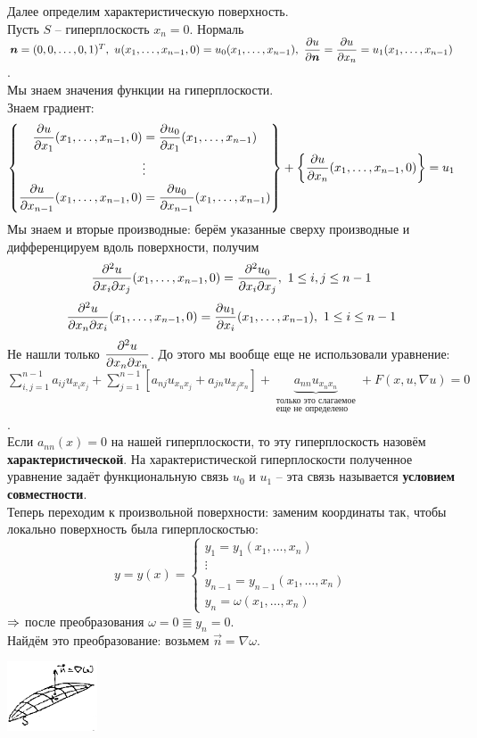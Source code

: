Далее определим характеристическую поверхность.\\
Пусть $S$ -- гиперплоскость $x_n = 0$. Нормаль $\boldsymbol{n} = (0,0,\dots,0, 1)^T,\ u(x_1, \dots, x_{n-1}, 0) = u_0(x_1, \dots, x_{n-1}),\ \dfrac{\partial u}{\partial\boldsymbol{n}} = \dfrac{\partial u}{\partial x_n} = u_1(x_1, \dots, x_{n-1}) $.\\
Мы знаем значения функции на гиперплоскости.\\
Знаем градиент:
\begin{equation*}
\left\{\begin{aligned}
\frac{\partial u}{\partial x_1}(x_1, \dots, x_{n-1}, 0) &= \frac{\partial u_0}{\partial x_1}(x_1, \dots, x_{n-1})\\ 
&\vdots \\
\frac{\partial u}{\partial x_{n-1}}(x_1, \dots, x_{n-1}, 0) &= \frac{\partial u_0}{\partial x_{n-1}}(x_1, \dots, x_{n-1})
\end{aligned} \right\}
+\left\{\frac{\partial u}{\partial x_n}(x_1,\dots,x_{n-1},0)\right\} = u_1
\end{equation*}
Мы знаем и вторые производные: берём указанные сверху производные и дифференцируем вдоль поверхности, получим \[\frac{\subd^2u}{\subd x_i\subd x_j}(x_1,\dots,x_{n-1}, 0) = \frac{\subd^2u_0}{\subd x_i\subd x_j},\ 1\le i,j \le n-1 \]
\[\frac{\partial^2u}{\partial x_n\partial x_i}(x_1,\dots,x_{n-1}, 0) = \frac{\partial u_1}{\partial x_i}(x_1,\dots,x_{n-1}),\ 1\le i\le n-1     \]
Не нашли только $\displaystyle\frac{\partial^2 u}{\partial x_n\partial x_n}$. До этого мы вообще еще не использовали уравнение:\\$\displaystyle\sum\limits_{i,j=1}^{n-1}a_{ij}u_{x_ix_j} + \displaystyle\sum\limits_{j=1}^{n-1}\left[a_{nj}u_{x_nx_j} + a_{jn}u_{x_jx_n}\right] + \underbrace{a_{nn}u_{x_nx_n}}_{\substack{\text{только это слагаемое}\\ \text{еще не определено}}} + F(x, u, \nabla u) = 0 $.\\
Если $a_{nn}(x) = 0$ на нашей гиперплоскости, то эту гиперплоскость назовём {\bf характеристической}. На характеристической гиперплоскости полученное уравнение задаёт функциональную связь $u_0$ и $u_1$ -- эта связь называется {\bf условием совместности}.\\
Теперь переходим к произвольной поверхности: заменим координаты так, чтобы локально поверхность была гиперплоскостью:\\
\[y = y(x) = \begin{cases} y_1 = y_1(x_1,\dots, x_n) \\ \vdots \\ y_{n-1} = y_{n-1}(x_1,\dots,x_n) \\ y_n = \omega(x_1,\dots,x_n) \end{cases} \]
$\Rightarrow$ после преобразования $\omega=0 \Equiv y_n=0$.\\
Найдём это преобразование: возьмем $\vec{n} = \nabla \omega$.
\begin{center}
\includegraphics[width=0.2\textwidth]{./2_1_new}
\end{center}

